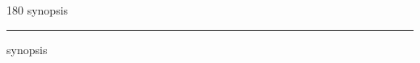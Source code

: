 
\begin{frame}
\begin{center}
\begin{turn}{180}
{\fontsize{2.5cm}{1em}\selectfont synopsis}
\end{turn}
\vspace{1em}\par  
\hrule
\vspace{1em}\par  
{\fontsize{2.5cm}{1em}\selectfont synopsis}
\end{center}
\end{frame}
